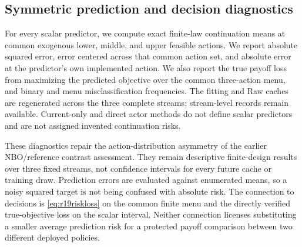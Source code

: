 \subsection{Symmetric prediction and decision diagnostics}
For every scalar predictor, we compute exact finite-law continuation means
at common exogenous lower, middle, and upper feasible actions. We report
absolute squared error, error centered across that common action set, and
absolute error at the predictor's own implemented action. We also report the
true payoff loss from maximizing the predicted objective over the common
three-action menu, and binary and menu misclassification frequencies.
The fitting and Raw caches are regenerated across the three complete
streams; stream-level records remain available. Current-only and direct
actor methods do not define scalar predictors and are not assigned invented
continuation risks.

These diagnostics repair the action-distribution asymmetry of the earlier
NBO/reference contrast assessment. They remain descriptive finite-design
results over three fixed streams, not confidence intervals for every future
cache or training draw. Prediction errors are evaluated against enumerated
means, so a noisy squared target is not being confused with absolute risk.
The connection to decisions is \eqref{eq:r19riskloss} on the common finite
menu and the directly verified true-objective loss on the scalar interval.
Neither connection licenses substituting a smaller average prediction risk
for a protected payoff comparison between two different deployed policies.
